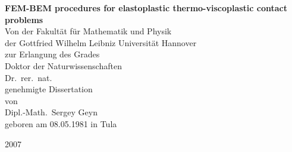 \begin{titlepage}
\pagestyle{empty}
\begin{center} 

\vspace*{1cm}
\huge{\textbf{\textsf{  FEM-BEM procedures for elastoplastic thermo-viscoplastic contact problems}}}\\
\vspace{2cm}
\large
 Von der Fakult\"at f\"ur Mathematik und Physik\\der Gottfried Wilhelm Leibniz Universit\"at Hannover\\
zur Erlangung des Grades\\Doktor der Naturwissenschaften\\Dr.\ rer.\ nat.\\
\vspace{2cm}
genehmigte Dissertation\\
\vspace{1.5cm}
von\\
\vspace{1.5cm}
\Large
Dipl.-Math.\ Sergey Geyn\\
\vspace{0.5cm}
\normalsize
geboren am 08.05.1981 in Tula

\vspace{1.0cm}
\large
2007
\vspace*{-2.0cm}
\end{center}
\end{titlepage}

